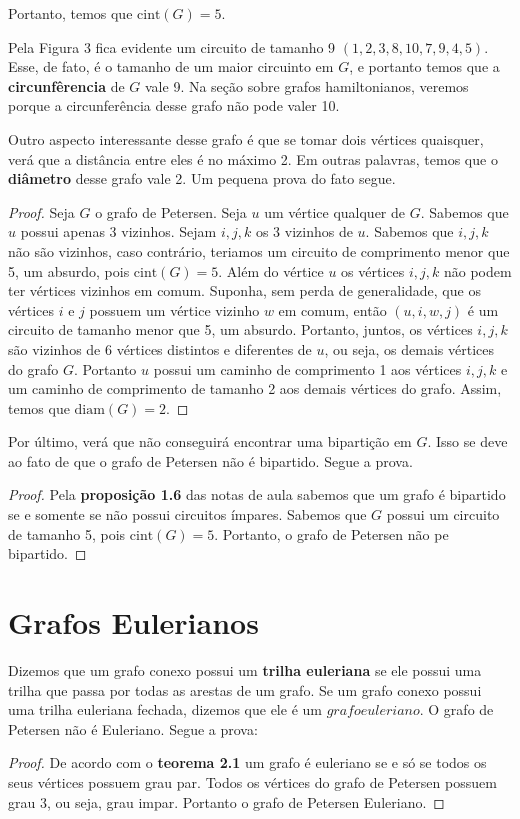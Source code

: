 \documentclass[11pt,a4paper]{exam}
\begin{document}
Portanto, temos que $\text{cint}(G) = 5$.\par

Pela Figura 3 fica evidente um  circuito de tamanho 9
$(1,2,3,8,10,7,9,4,5)$. Esse, de fato, é o tamanho de um maior circuinto
em $G$, e portanto temos que a \textbf{circunfêrencia} de $G$ vale 9. Na
seção sobre grafos hamiltonianos, veremos porque a circunferência desse
grafo não pode valer 10.

Outro aspecto interessante desse grafo é que se tomar dois vértices
quaisquer, verá que a distância entre eles é no máximo 2. Em
outras palavras, temos que o \textbf{diâmetro} desse grafo vale 2. Um
pequena prova do fato segue.
\begin{proof}
    Seja $G$ o grafo de Petersen. Seja $u$ um vértice qualquer de $G$.
    Sabemos que $u$ possui apenas  3 vizinhos.\newline
    Sejam $i,j,k$ os 3 vizinhos de $u$. Sabemos que
    $i,j,k$ não são vizinhos, caso contrário, teriamos um circuito de
    comprimento menor que 5, um absurdo, pois $\text{cint}(G)=5$. Além
    do vértice $u$ os vértices
    $i,j,k$ não podem ter vértices vizinhos em comum. Suponha, sem perda
    de generalidade, que os vértices $i$ e $j$ possuem um vértice
    vizinho $w$ em comum, então $(u,i,w,j)$ é um circuito de tamanho
    menor que 5, um absurdo.\newline
    Portanto, juntos, os vértices $i,j,k$ são vizinhos de 6 vértices
    distintos e diferentes de $u$, ou seja, os demais vértices do grafo
    $G$. Portanto $u$ possui um caminho de
    comprimento 1 aos vértices $i,j,k$ e um caminho de comprimento de tamanho 2 aos
    demais vértices do grafo.\newline
    Assim, temos que $\text{diam}(G)=2$.
\end{proof}

Por último, verá que não conseguirá encontrar uma bipartição em $G$.
Isso se deve ao fato de que o grafo de Petersen não é bipartido. Segue
a prova.
\begin{proof}
    Pela \textbf{proposição 1.6} das notas de aula sabemos que um grafo
    é bipartido se e somente se não possui circuitos ímpares. Sabemos
    que $G$ possui um circuito de tamanho 5, pois $\text{cint}(G)=5$.
    Portanto, o grafo de Petersen não pe bipartido.
\end{proof}

\section{Grafos Eulerianos}
Dizemos que um grafo conexo possui um \textbf{trilha euleriana} se ele possui
uma trilha que passa por todas as arestas de um grafo. Se um grafo
conexo
possui uma trilha euleriana fechada, dizemos que ele é um $grafo
euleriano$.\newline
O grafo de Petersen não é Euleriano. Segue a prova:
\begin{proof}
    De acordo com o \textbf{teorema 2.1} um grafo é euleriano se e só se
    todos
    os seus vértices possuem grau par. Todos os vértices do grafo de
    Petersen possuem grau 3, ou seja, grau impar. Portanto o grafo de
    Petersen Euleriano.
\end{proof}
\end{document}

